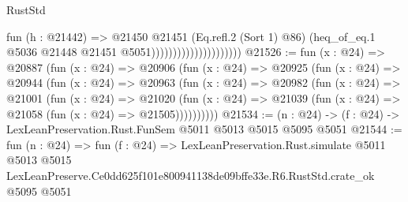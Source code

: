 \begin{lexlean}{RustStd}
\begin{coremodule}
                                          fun (h : @21442) =>
                                          @21450
                                            @21451
                                            (Eq.refl.{2} (Sort 1) @86)
                                            (heq_of_eq.{1}
                                              @5036
                                              @21448
                                              @21451
                                              @5051)))))))))))))))))))))
@21526 := fun (x : @24) =>
  @20887
    (fun (x : @24) =>
    @20906
      (fun (x : @24) =>
      @20925
        (fun (x : @24) =>
        @20944
          (fun (x : @24) =>
          @20963
            (fun (x : @24) =>
            @20982
              (fun (x : @24) =>
              @21001
                (fun (x : @24) =>
                @21020
                  (fun (x : @24) =>
                  @21039 (fun (x : @24) => @21058 (fun (x : @24) => @21505))))))))))
@21534 := (n : @24) -> (f : @24) -> LexLeanPreservation.Rust.FunSem @5011 @5013 @5015 @5095 @5051
@21544 := fun (n : @24) =>
  fun (f : @24) =>
  LexLeanPreservation.Rust.simulate
    @5011
    @5013
    @5015
    LexLeanPreserve.Ce0dd625f101e800941138de09bffe33e.R6.RustStd.crate_ok
    @5095
    @5051
\end{coremodule}
\end{lexlean}
